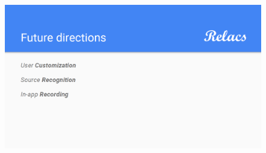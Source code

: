 \documentclass[a4paper]{article}
\begin{document}
\begin{figure}[h]
\centering
\includegraphics[width=\linewidth]{./Slide9}
\label{fig:Slide9}
\end{figure}
\end{document}
